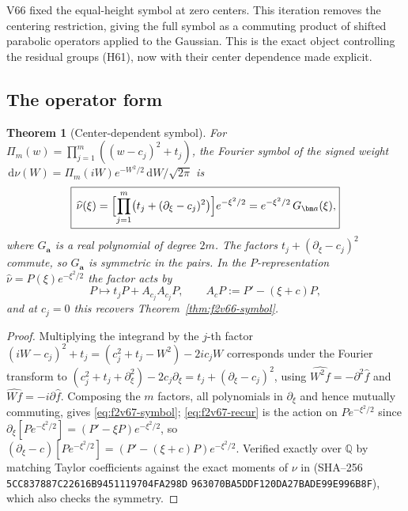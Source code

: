 \documentclass[11pt]{article}
\newtheorem{theorem}{Theorem}[section]
\theoremstyle{definition}
\theoremstyle{remark}
\newcommand{\dd}{\,\mathrm d}
\begin{document}
V66 fixed the equal-height symbol at zero centers.  This iteration
removes the centering restriction, giving the full symbol as a commuting
product of shifted parabolic operators applied to the Gaussian.  This is
the exact object controlling the residual groups (H61), now with their
center dependence made explicit.

\subsection{The operator form}

\begin{theorem}[Center-dependent symbol]
\label{thm:f2v67-symbol}
For \(\Pi_m(w)=\prod_{j=1}^m((w-c_j)^2+t_j)\), the Fourier symbol of the
signed weight \(\dd\nu(W)=\Pi_m(iW)e^{-W^2/2}\dd W/\sqrt{2\pi}\) is
\begin{equation}
 \boxed{\,\widehat\nu(\xi)
 =\Bigl[\prod_{j=1}^m\bigl(t_j+(\partial_\xi-c_j)^2\bigr)\Bigr]e^{-\xi^2/2}
 =e^{-\xi^2/2}\,G_{\bm a}(\xi),}
 \label{eq:f2v67-symbol}
\end{equation}
where \(G_{\bm a}\) is a real polynomial of degree \(2m\).  The factors
\(t_j+(\partial_\xi-c_j)^2\) commute, so \(G_{\bm a}\) is symmetric in the
pairs.  In the \(P\)-representation \(\widehat\nu=P(\xi)e^{-\xi^2/2}\) the
factor acts by
\begin{equation}
 P\longmapsto t_jP+A_{c_j}A_{c_j}P,\qquad
 A_c P:=P'-(\xi+c)P,
 \label{eq:f2v67-recur}
\end{equation}
and at \(c_j=0\) this recovers Theorem~\ref{thm:f2v66-symbol}.
\end{theorem}

\begin{proof}
Multiplying the integrand by the \(j\)-th factor
\((iW-c_j)^2+t_j=(c_j^2+t_j-W^2)-2ic_jW\) corresponds under the Fourier
transform to \((c_j^2+t_j+\partial_\xi^2)-2c_j\partial_\xi
=t_j+(\partial_\xi-c_j)^2\), using \(\widehat{W^2f}=-\partial^2\widehat f\)
and \(\widehat{Wf}=-i\partial\widehat f\).  Composing the \(m\) factors,
all polynomials in \(\partial_\xi\) and hence mutually commuting, gives
\eqref{eq:f2v67-symbol}; \eqref{eq:f2v67-recur} is the action on
\(Pe^{-\xi^2/2}\) since \(\partial_\xi[Pe^{-\xi^2/2}]=(P'-\xi P)e^{-\xi^2/2}\),
so \((\partial_\xi-c)[Pe^{-\xi^2/2}]=(P'-(\xi+c)P)e^{-\xi^2/2}\).  Verified
exactly over \(\mathbb Q\) by matching Taylor coefficients against the
exact moments of \(\nu\) in
 (SHA--256
\texttt{5CC837887C22616B9451119704FA298D}\allowbreak
\texttt{963070BA5DDF120DA27BADE99E996B8F}), which also checks the
symmetry.
\end{proof}
\end{document}
